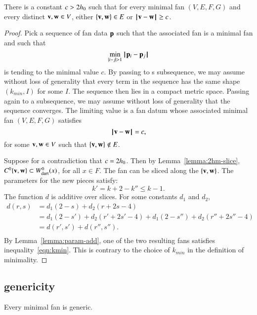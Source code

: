 \begin{lemma}\label{lemma:c-bound}
There is a constant $c>2{h_0}$ such that for every minimal fan $(V,E,F,G)$
and every distinct ${\mathbf v},{\mathbf w}\in V$, either $\{{\mathbf v},{\mathbf w}\}\in E$ or ${\hskip0.1em|\hskip-0.15em|\hskip0.1em}{\mathbf v} - {\mathbf w}{\hskip0.1em|\hskip-0.15em|\hskip0.1em}\ge c$.
\end{lemma}

\begin{proof} Pick a sequence of fan data ${\mathbf p}$ such that the associated
fan is a minimal fan and such that 
$$
\min_{|i-j|>1} \norm{\p_i}{\p_j}
$$
is tending to the minimal value $c$.  By passing to s subsequence, we may
assume without loss of generality that every term in the sequence has the same shape $(k_{min},I)$ for some $I$.  The sequence then lies in a compact metric space.  Passing again to a subsequence, we may assume without loss of generality that the sequence converges.  The limiting value is a fan datum whose associated minimal fan $(V,E,F,G)$ satisfies
$$
{\hskip0.1em|\hskip-0.15em|\hskip0.1em}{\mathbf v} - {\mathbf w}{\hskip0.1em|\hskip-0.15em|\hskip0.1em}=c,
$$
for some ${\mathbf v},{\mathbf w}\in V$ such that $\{{\mathbf v},{\mathbf w}\}\not\in E$.

Suppose for a contradiction that $c=2{h_0}$.  Then by Lemma~\ref{lemma:2hm-slice}, $C^0\{{\mathbf v},{\mathbf w}\}\subset W^0_{\text{dart}}(x)$, for all $x\in F$.
The fan can be sliced along the $\{{\mathbf v},{\mathbf w}\}$.  
The parameters for the new pieces satisfy:
$$
k' = k+2 - k'' \le k-1.
$$
The function $d$ is additive over slices.  For some constants $d_1$ and $d_2$,
\begin{equation}\label{eqn:drs}
\begin{array}{lll}
 d(r,s) &= d_1 (2 - s) + d_2 (r + 2 s-4) \\
&= d_1 (2-s') + d_2 (r'+2 s'-4) + d_1 (2-s'') + d_2 (r''+2s''-4)\\
&= d(r',s') + d(r'',s''). \\
\end{array}
\end{equation}
By Lemma~\ref{lemma:param-add}, one of the two resulting fans satisfies inequality~\ref{eqn:kmin}.  This is contrary to the choice of $k_{min}$ in the definition of minimality.
\end{proof}





\subsection{genericity}

\begin{lemma}\label{lemma:circular-nonmin}
Every minimal fan is generic.
\end{lemma}

